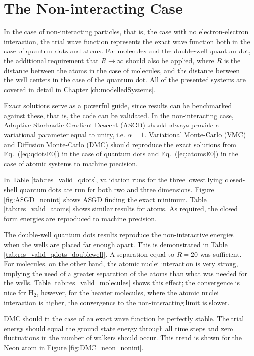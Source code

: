 \section{The Non-interacting Case}

In the case of non-interacting particles, that is, the case with no electron-electron interaction, the trial wave function represents the exact wave function both in the case of quantum dots and atoms. For molecules and the double-well quantum dot, the additional requirement that $R\to\infty$ should also be applied, where $R$ is the distance between the atoms in the case of molecules, and the distance between the well centers in the case of the quantum dot. All of the presented systems are covered in detail in Chapter \ref{ch:modelledSystems}.

Exact solutions serve as a powerful guide, since results can be benchmarked against these, that is, the code can be validated. In the non-interacting case, Adaptive Stochastic Gradient Descent (ASGD) should always provide a variational parameter equal to unity, i.e. $\alpha=1$. Variational Monte-Carlo (VMC) and Diffusion Monte-Carlo (DMC) should reproduce the exact solutions from Eq.~(\ref{eq:qdotsE0}) in the case of quantum dots and Eq.~(\ref{eq:atomsE0}) in the case of atomic systems to machine precision. 

In Table \ref{tab:res_valid_qdots}, validation runs for the three lowest lying closed-shell quantum dots are run for both two and three dimensions. Figure \ref{fig:ASGD_nonint} shows ASGD finding the exact minimum. Table \ref{tab:res_valid_atoms} shows similar results for atoms. As required, the closed form energies are reproduced to machine precision.

The double-well quantum dots results reproduce the non-interactive energies when the wells are placed far enough apart. This is demonstrated in Table \ref{tab:res_valid_qdots_doublewell}. A separation equal to $R = 20$ was sufficient. For molecules, on the other hand, the atomic nuclei interaction is very strong, implying the need of a greater separation of the atoms than what was needed for the wells. Table \ref{tab:res_valid_molecules} shows this effect; the convergence is nice for $\mathrm{H_2}$, however, for the heavier molecules, where the atomic nuclei interaction is higher, the convergence to the non-interacting limit is slower.

DMC should in the case of an exact wave function be perfectly stable. The trial energy should equal the ground state energy through all time steps and zero fluctuations in the number of walkers should occur. This trend is shown for the Neon atom in Figure \ref{fig:DMC_neon_nonint}.

